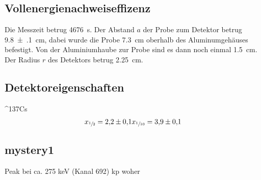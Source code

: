 \subsection{Vollenergienachweiseffizenz}
\label{sec:Vollenergienachweiseffizenz}
Die Messzeit betrug \SI{ 4676}{\second}. Der Abstand $a$ der Probe zum Detektor betrug
\SI{9.8(1)}{\centi\meter}, dabei wurde die Probe \SI{7.3}{\centi\meter} oberhalb
des Aluminumgehäuses befestigt. Von der Aluminiumhaube zur Probe sind es dann noch
einmal \SI{1.5}{\centi\meter}. Der Radius $r$ des Detektors betrug \SI{2.25}{\centi\meter}.


\subsection{Detektoreigenschaften}
\label{sec:Detektoreigenschaften}
{}^{137}Cs 
\begin{align}
  x_{\sfrac{1}{2}} = \num{2.2(1)}
  x_{\sfrac{1}{10}} = \num{3.9(1)}
\end{align}


\subsection{mystery1}
\label{sec:}
Peak bei ca. 275 keV (Kanal 692) kp woher


